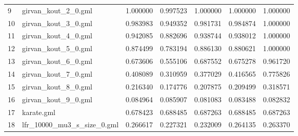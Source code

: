 \begin{tabular}{llrrrrr}
9  &         girvan\_kout\_2\_0.gml &                          1.000000 &                             0.997523 &                            1.000000 &                           1.000000 &                        1.000000 \\
10 &         girvan\_kout\_3\_0.gml &                          0.983983 &                             0.949352 &                            0.981731 &                           0.984874 &                        1.000000 \\
11 &         girvan\_kout\_4\_0.gml &                          0.942085 &                             0.882696 &                            0.938744 &                           0.938012 &                        1.000000 \\
12 &         girvan\_kout\_5\_0.gml &                          0.874499 &                             0.783194 &                            0.886130 &                           0.880621 &                        1.000000 \\
13 &         girvan\_kout\_6\_0.gml &                          0.673606 &                             0.555106 &                            0.687552 &                           0.675278 &                        0.961720 \\
14 &         girvan\_kout\_7\_0.gml &                          0.408089 &                             0.310959 &                            0.377029 &                           0.416565 &                        0.775826 \\
15 &         girvan\_kout\_8\_0.gml &                          0.216340 &                             0.174776 &                            0.207875 &                           0.209499 &                        0.318571 \\
16 &         girvan\_kout\_9\_0.gml &                          0.084964 &                             0.085907 &                            0.081083 &                           0.083488 &                        0.082832 \\
17 &                  karate.gml &                          0.678423 &                             0.688485 &                            0.687263 &                           0.688485 &                        0.687263 \\
18 &  lfr\_10000\_mu3\_s\_size\_0.gml &                          0.266617 &                             0.227321 &                            0.232009 &                           0.264135 &                        0.263370 \\

\end{tabular}
